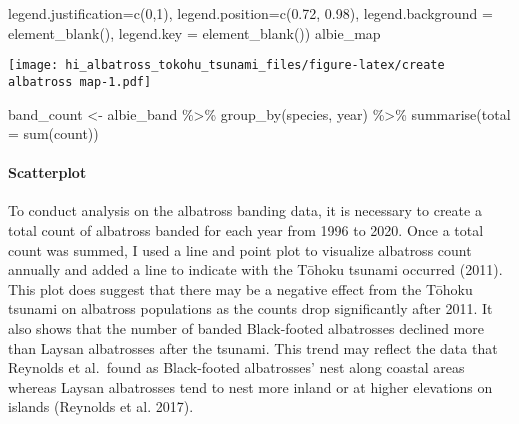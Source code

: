 \documentclass[
]{article}
\newenvironment{Shaded}{\begin{snugshade}}{\end{snugshade}}
\newcommand{\AttributeTok}[1]{\textcolor[rgb]{0.77,0.63,0.00}{#1}}
\newcommand{\DecValTok}[1]{\textcolor[rgb]{0.00,0.00,0.81}{#1}}
\newcommand{\FloatTok}[1]{\textcolor[rgb]{0.00,0.00,0.81}{#1}}
\newcommand{\FunctionTok}[1]{\textcolor[rgb]{0.00,0.00,0.00}{#1}}
\newcommand{\NormalTok}[1]{#1}
\newcommand{\OtherTok}[1]{\textcolor[rgb]{0.56,0.35,0.01}{#1}}
\newcommand{\SpecialCharTok}[1]{\textcolor[rgb]{0.00,0.00,0.00}{#1}}
\begin{document}
\begin{Shaded}
\begin{Highlighting}[]
           \AttributeTok{legend.justification=}\FunctionTok{c}\NormalTok{(}\DecValTok{0}\NormalTok{,}\DecValTok{1}\NormalTok{), }
           \AttributeTok{legend.position=}\FunctionTok{c}\NormalTok{(}\FloatTok{0.72}\NormalTok{, }\FloatTok{0.98}\NormalTok{),}
           \AttributeTok{legend.background =} \FunctionTok{element\_blank}\NormalTok{(),}
           \AttributeTok{legend.key =} \FunctionTok{element\_blank}\NormalTok{())}
\NormalTok{albie\_map}
\end{Highlighting}
\end{Shaded}

\texttt{[image: hi\_albatross\_tokohu\_tsunami\_files/figure-latex/create albatross map-1.pdf]}

\begin{Shaded}
\begin{Highlighting}[]
\NormalTok{band\_count }\OtherTok{\textless{}{-}}\NormalTok{ albie\_band }\SpecialCharTok{\%\textgreater{}\%} 
  \FunctionTok{group\_by}\NormalTok{(species, year) }\SpecialCharTok{\%\textgreater{}\%} 
  \FunctionTok{summarise}\NormalTok{(}\AttributeTok{total =} \FunctionTok{sum}\NormalTok{(count))}
\end{Highlighting}
\end{Shaded}

\hypertarget{scatterplot}{%
\paragraph{Scatterplot}\label{scatterplot}}

To conduct analysis on the albatross banding data, it is necessary to
create a total count of albatross banded for each year from 1996 to
2020. Once a total count was summed, I used a line and point plot to
visualize albatross count annually and added a line to indicate with the
Tōhoku tsunami occurred (2011). This plot does suggest that there may be
a negative effect from the Tōhoku tsunami on albatross populations as
the counts drop significantly after 2011. It also shows that the number
of banded Black-footed albatrosses declined more than Laysan albatrosses
after the tsunami. This trend may reflect the data that Reynolds et
al.~found as Black-footed albatrosses' nest along coastal areas whereas
Laysan albatrosses tend to nest more inland or at higher elevations on
islands (Reynolds et al. 2017).
\end{document}
